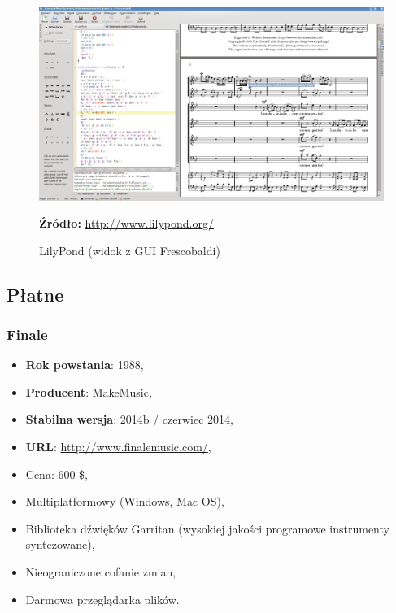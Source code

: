 \documentclass[polish,thesis,12pt]{dcsbook}
\newcommand{\source}[2]{
  	\caption*{\textbf{Źródło:} \href{#1}{{#2}}}
}
\begin{document}
\begin{figure}[H]
  \centering
  \includegraphics[scale=0.3,bb=0 0 1355 762]{img/lilypond.png}
  \caption{LilyPond (widok z GUI Frescobaldi)}
  \label{lilypond}
  \source{http://www.lilypond.org/easier-editing.html}{http://www.lilypond.org/}
\end{figure}

\subsection{Płatne}
\subsubsection{Finale}
\begin{itemize}
  \item \textbf{Rok powstania}: 1988,
  \item \textbf{Producent}: MakeMusic,
  \item \textbf{Stabilna wersja}: 2014b / czerwiec 2014,
  \item \textbf{URL}: \url{http://www.finalemusic.com/},
  \item Cena: 600 \$,
  \item Multiplatformowy (Windows, Mac OS),
  \item Biblioteka dźwięków Garritan (wysokiej jakości programowe instrumenty syntezowane),
  \item Nieograniczone cofanie zmian,
  \item Darmowa przeglądarka plików.
\end{itemize}
\end{document}
